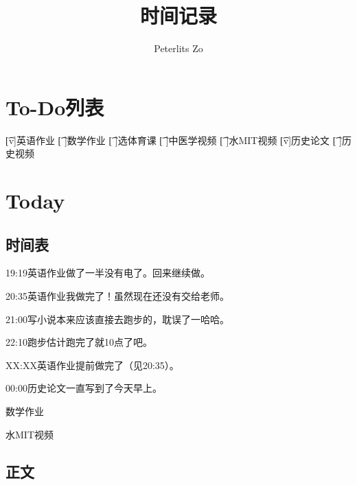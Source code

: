 \documentclass{peterlitsdoc}
\title{时间记录}
\author{Peterlits Zo}
\begin{document}
\maketitle
\tableofcontents
\newpage


\section{To-Do列表}
\begin{plttodoenv}{4}
\t[v]英语作业       \t[ ]数学作业       \t[ ]选体育课       \t[ ]中医学视频
\t[ ]水MIT视频      \t[v]历史论文       \t[ ]历史视频
\end{plttodoenv}


\section{Today}

\subsection{时间表}

\begin{pltplan}
\item[x]{19:19}{英语作业}{做了一半没有电了。回来继续做。}
\item[v]{20:35}{英语作业}{我做完了！虽然现在还没有交给老师。}
\item[v]{21:00}{写小说}{本来应该直接去跑步的，耽误了一哈哈。}
\item[v]{22:10}{跑步}{估计跑完了就10点了吧。}
\item[v]{XX:XX}{英语作业}{提前做完了（见20:35）。}
\item[v]{00:00}{历史论文}{一直写到了今天早上。}
\item[ ]{}{数学作业}{}
\item[ ]{}{水MIT视频}{}
\end{pltplan}

\subsection{正文}
\end{document}
